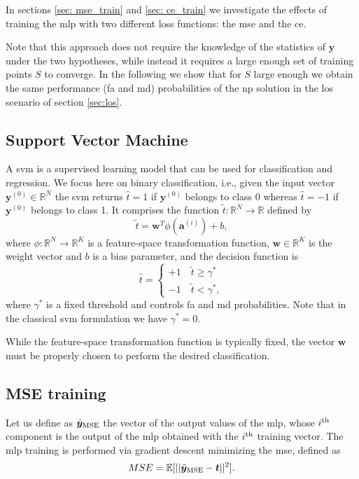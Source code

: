 \documentclass[draftcls,onecolumn,12pt]{IEEEtran}
\newcommand{\ie}{i.e., }
\begin{document}
In sections \ref{sec: mse_train} and \ref{sec: ce_train} we investigate the effects of training the \ac{mlp} with two different loss functions: the \ac{mse} and the \ac{ce}.

Note that this approach does not require the knowledge of the statistics of $\bm{y}$ under the two hypotheses, while instead it requires a large enough set of training points $S$ to converge. In the following we show that for $S$ large enough we obtain the same performance (\ac{fa} and \ac{md}) probabilities of the \ac{np} solution in the \ac{los} scenario of section \ref{sec:los}.

\subsection{Support Vector Machine}\label{sec:svm}
A \ac{svm} \cite{Bishop2006} is a supervised learning model that can be used for classification and regression. We focus here on binary classification, \ie given the input vector $\bm{y}^{(0)} \in \mathbb{R}^N$ the \ac{svm} returns $\hat{t} = 1$ if $\bm{y}^{(0)}$ belongs to class 0 whereas $\hat{t}=-1$ if $\bm{y}^{(0)}$ belongs to class 1. It comprises the function $\tilde{t}: \mathbb{R}^N \to \mathbb{R}$ defined by
\begin{equation}
\label{eq:svm}
\tilde{t} = \mathbf{w}^T \phi (\mathbf{a}^{(i)}) + b,
\end{equation}
where $\phi: \mathbb{R}^N \to \mathbb{R}^K$ is a feature-space transformation function, $\mathbf{w} \in \mathbb{R}^K$ is the weight vector and $b$ is a bias parameter, and the decision function is
\begin{equation}
\label{eq:cases}
\hat{t} = 
\begin{cases}
+1 \quad \tilde{t}  \geq \gamma^* \\
-1 \quad \tilde{t}  < \gamma^*,
\end{cases}		
\end{equation} 
where $\gamma^*$ is a fixed threshold and controls \ac{fa} and \ac{md} probabilities. Note that in the classical \ac{svm} formulation we have $\gamma^* = 0$.

While the feature-space transformation function is typically fixed, the vector $\mathbf{w}$ must be properly chosen to perform the desired classification. 

\subsection{ MSE training \label{sec: mse_train}}
Let us define as $\tilde{\bm{y}}_{\rm MSE}$ the vector of the output values of the \ac{mlp}, whose $i^{\rm th}$ component is the output of the \ac{mlp} obtained with the $i^{\rm th}$ training vector. The \ac{mlp} training is performed via gradient descent minimizing the \ac{mse}, defined as
\begin{equation}
MSE = \mathbb{E}[||\tilde{\bm{y}}_{\rm MSE}-\bm{t}||^2].
\end{equation}
\end{document}

